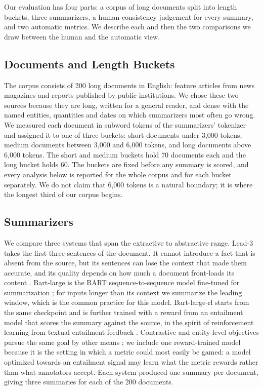 Our evaluation has four parts: a corpus of long documents split into length buckets, three summarizers, a human consistency judgement for every summary, and two automatic metrics. We describe each and then the two comparisons we draw between the human and the automatic view.

\subsection{Documents and Length Buckets}
The corpus consists of 200 long documents in English: feature articles from news magazines and reports published by public institutions. We chose these two sources because they are long, written for a general reader, and dense with the named entities, quantities and dates on which summarizers most often go wrong. We measured each document in subword tokens of the summarizers' tokenizer and assigned it to one of three buckets: short documents under 3,000 tokens, medium documents between 3,000 and 6,000 tokens, and long documents above 6,000 tokens. The short and medium buckets hold 70 documents each and the long bucket holds 60. The buckets are fixed before any summary is scored, and every analysis below is reported for the whole corpus and for each bucket separately. We do not claim that 6,000 tokens is a natural boundary; it is where the longest third of our corpus begins.

\subsection{Summarizers}
We compare three systems that span the extractive to abstractive range. Lead-3 takes the first three sentences of the document. It cannot introduce a fact that is absent from the source, but its sentences can lose the context that made them accurate, and its quality depends on how much a document front-loads its content \citep{grenander2019leadbias}. Bart-large is the BART sequence-to-sequence model fine-tuned for summarization \citep{lewis2020bart}; for inputs longer than its context we summarize the leading window, which is the common practice for this model. Bart-large-rl starts from the same checkpoint and is further trained with a reward from an entailment model that scores the summary against the source, in the spirit of reinforcement learning from textual entailment feedback \citep{roit2023rlef}. Contrastive and entity-level objectives pursue the same goal by other means \citep{cao2021cliff,nan2021entity}; we include one reward-trained model because it is the setting in which a metric could most easily be gamed: a model optimized towards an entailment signal may learn what the metric rewards rather than what annotators accept. Each system produced one summary per document, giving three summaries for each of the 200 documents.

